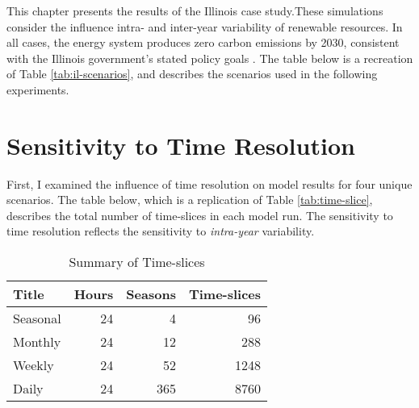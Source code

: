 This chapter presents the results of the Illinois case study.These simulations
consider the influence intra- and inter-year variability of renewable resources.
In all cases, the energy system produces zero carbon emissions by 2030,
consistent with the Illinois government's stated policy goals
\cite{harmon_climate_2021,office_of_governor_jb_pritzker_gov_2021}. The table
below is a recreation of Table \ref{tab:il-scenarios}, and describes the
scenarios used in the following experiments.

\begin{table}[H]
  \centering
  \caption{Summary of Illinois Case Study Scenarios}
\end{table}


\section{Sensitivity to Time Resolution}
\label{section:time_res}

First, I examined the influence of time resolution on model results for four
unique scenarios. The table below, which is a replication of  Table \ref{tab:time-slice},
describes the total number of time-slices in each model run.
The sensitivity to time resolution reflects the sensitivity to \textit{intra-year}
variability.

\begin{table}[H]
  \centering
  \caption{Summary of Time-slices}
  \begin{tabular}{lrrr}
    \toprule
    Title & Hours & Seasons & Time-slices \\
    \midrule
    Seasonal & 24 & 4 & 96\\
    Monthly & 24 & 12 & 288\\
    Weekly & 24 & 52 & 1248\\
    Daily & 24 & 365 & 8760\\
    \bottomrule
  \end{tabular}
\end{table}


